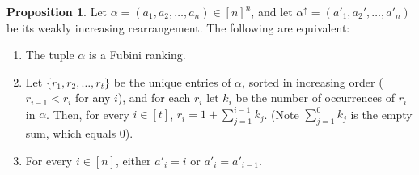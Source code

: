 \documentclass{amsart}
\theoremstyle{definition}
\newtheorem{proposition}{Proposition}[section]
\theoremstyle{definition}
\theoremstyle{remark}
\begin{document}
\begin{proposition}\label{prop:equivalent characterizations of Fubini}
    Let $\alpha = (a_1, a_2,\ldots, a_n) \in [n]^n$, and let $\alpha^{\uparrow} = (a'_1,a_2', \ldots, a'_n)$ be its weakly increasing rearrangement. The following are equivalent:
    \begin{enumerate}
        \item[(a)] The tuple $\alpha$ is a Fubini ranking.
        \item[(b)] Let $\{r_1, r_2, \ldots, r_t\}$ be the unique entries of $\alpha$, sorted in increasing order ($r_{i-1} < r_i$ for any $i$), and for each $r_i$ let $k_i$ be the number of occurrences of $r_i$ in $\alpha$. Then, for every $i \in [t]$, $r_i = 1 + \sum_{j=1}^{i-1} k_j$. (Note $\sum_{j=1}^0 k_j$ is the empty sum, which equals 0).
        \item[(c)] For every $i \in [n]$, either $a'_i = i$ or $a'_i = a'_{i-1}$. 
    \end{enumerate}
\end{proposition}
\end{document}
